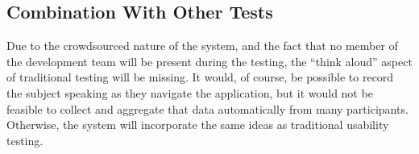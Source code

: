 \subsection{Combination With Other Tests}

Due to the crowdsourced nature of the system, and the fact that no member of the
development team will be present during the testing, the ``think aloud'' aspect
of traditional testing will be missing. It would, of course, be possible to
record the subject speaking as they navigate the application, but it would not
be feasible to collect and aggregate that data automatically from many
participants. Otherwise, the system will incorporate the same ideas as
traditional usability testing.

